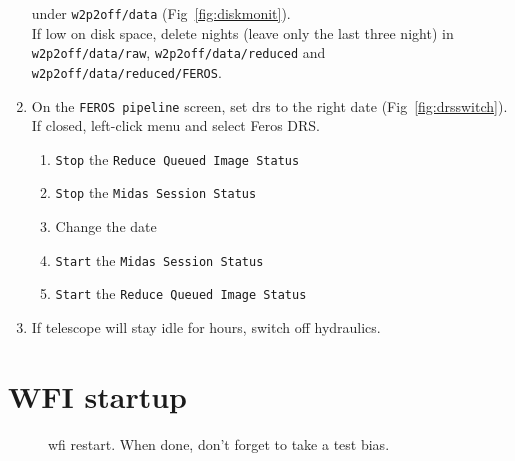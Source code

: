 \documentclass[11pt,fleqn]{book} %
\begin{document}
\begin{enumerate}
        under \texttt{w2p2off/data} (Fig~\ref{fig:diskmonit}). \\
        If low on disk space, delete nights (leave only the last three night) in 
        \texttt{w2p2off/data/raw}, \texttt{w2p2off/data/reduced} and \texttt{w2p2off/data/reduced/FEROS}.                 
  \item On the \texttt{FEROS pipeline} screen, set \gls{drs} to the right date (Fig~\ref{fig:drsswitch}).\\
  If closed, left-click menu and select Feros DRS.  
        \label{list:drs}
		\begin{enumerate}
		  \item \texttt{Stop} the \texttt{Reduce Queued Image Status}
		  \item \texttt{Stop} the \texttt{Midas Session Status}
		  \item Change the date 
		  \item \texttt{Start} the \texttt{Midas Session Status}
		  \item \texttt{Start} the \texttt{Reduce Queued Image Status}
		\end{enumerate}
  \item If telescope will stay idle for hours, switch off hydraulics.
\end{enumerate}
\newpage
\section{WFI startup}

\begin{figure}[h!]
\centering
{}%
\hspace{0.15\linewidth}
%

%
\hspace{0.05\linewidth}

\hspace{0.05\linewidth}
\caption[Wide field imager restart]{\gls{wfi} restart.  When done, don't forget to take a test bias.}
\label{fig:wfi-restart}
\end{figure}
\end{document}
